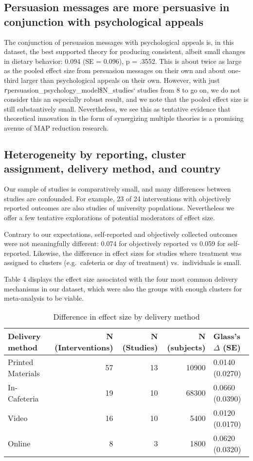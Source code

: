 \documentclass[sn-nature,pdflatex]{sn-jnl}
\begin{document}
\subsection{Persuasion messages are more persuasive in conjunction with
psychological appeals}\label{sec2.10}

The conjunction of persuasion messages with psychological appeals is, in
this dataset, the best supported theory for producing consistent, albeit
small changes in dietary behavior: 0.094 (SE = 0.096), p = .3552. This
is about twice as large as the pooled effect size from persuasion
messages on their own and about one-third larger than psychological
appeals on their own. However, with just
\texttt{r}persuasion\_psychology\_model\$N\_studies` studies from 8 to
go on, we do not consider this an especially robust result, and we note
that the pooled effect size is still substantively small. Nevertheless,
we see this as tentative evidence that theoretical innovation in the
form of synergizing multiple theories is a promising avenue of MAP
reduction research.

\subsection{Heterogeneity by reporting, cluster assignment, delivery
method, and country}\label{sec2.11}

Our sample of studies is comparatively small, and many differences
between studies are confounded. For example, 23 of 24 interventions with
objectively reported outcomes are also studies of university
populations. Nevertheless we offer a few tentative explorations of
potential moderators of effect size.

Contrary to our expectations, self-reported and objectively collected
outcomes were not meaningfully different: 0.074 for objectively reported
vs 0.059 for self-reported. Likewise, the difference in effect sizes for
studies where treatment was assigned to clusters (e.g.~cafeteria or day
of treatment) vs.~individuals is small.

Table 4 displays the effect size associated with the four most common
delivery mechanisms in our dataset, which were also the groups with
enough clusters for meta-analysis to be viable.

\begin{table}[!h]
\centering
\caption{\label{tab:table_four}Difference in effect size by delivery method}
\centering
\begin{tabular}[t]{lrrrl}
\toprule
Delivery method & N (Interventions) & N (Studies) & N (subjects) & Glass's $\Delta$ (SE)\\
\midrule
Printed Materials & 57 & 13 & 10900 & 0.0140 (0.0270)\\
In-Cafeteria & 19 & 10 & 68300 & 0.0660 (0.0390)\\
Video & 16 & 10 & 5400 & 0.0120 (0.0170)\\
Online & 8 & 3 & 1800 & 0.0620 (0.0320)\\
\bottomrule
\end{tabular}
\end{table}
\end{document}
